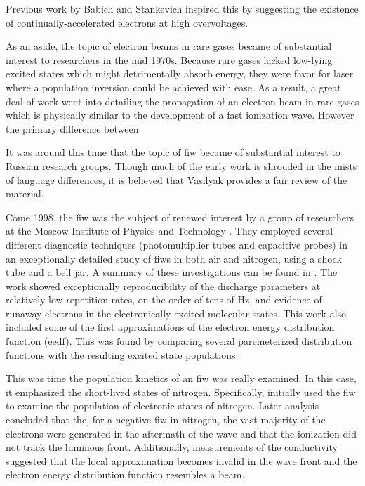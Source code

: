 Previous work by
Babich and Stankevich \cite{Babich1973} inspired this by suggesting the
existence of continually-accelerated electrons at high overvoltages.

As an aside, the topic of electron beams in rare gases became of substantial
interest to researchers in the mid 1970s. Because rare gases lacked low-lying
excited states which might detrimentally absorb energy, they were favor for
laser where a population inversion could be achieved with ease. As a result, a
great deal of work went into detailing the propagation of an electron beam in
rare gases which is physically similar to the development of a fast ionization
wave. However the primary difference between

It was around this time that the topic of fiw became of substantial interest to
Russian research groups. Though much of the early work is shrouded in the mists
of language differences, it is believed that Vasilyak \cite{Vasilyak1994}
provides a fair review of the material. 

Come 1998, the fiw was the subject of renewed interest by a group of researchers
at the Moscow Institute of Physics and Technology \cite{Anikin1998}. They
employed several different diagnostic techniques (photomultiplier tubes and
capacitive probes) in an exceptionally detailed study of fiws in both air and
nitrogen, using a shock tube and a bell jar. A summary of these investigations
can be found in \cite{Starikovskaia2001}. The work showed exceptionally
reproducibility of the discharge parameters at relatively low repetition rates,
on the order of tens of Hz, and evidence of runaway electrons in the
electronically excited molecular states. This work also included some of the
first approximations of the electron energy distribution function (\acs{eedf}).
This was found by comparing several paremeterized distribution functions with
the resulting excited state populations. 

This was time the population kinetics of an fiw was really examined. In this
case, it emphasized the short-lived states of nitrogen. Specifically,
\cite{Pancheshnyi1998} initially used the fiw to examine the population of
electronic states of nitrogen. Later analysis \cite{Pancheshnyi1999} concluded
that the, for a negative fiw in nitrogen, the vast majority of the electrons
were generated in the aftermath of the wave and that the ionization did not
track the luminous front. Additionally, measurements of the conductivity
suggested that the local approximation becomes invalid in the wave front and the
electron energy distribution function resembles a beam.

